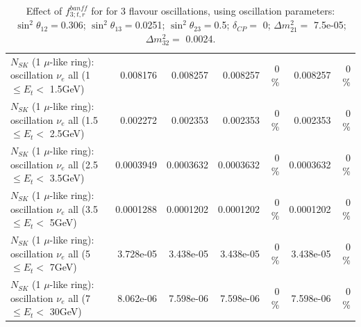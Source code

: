 \begin{table}
\begin{tabular}{| l | r | r | r  r | r  r |}
$N_{SK}$ (1 $\mu$-like ring): oscillation $\nu_{e}$ all (1 $\leq E_{t} <$ 1.5GeV) &        0.008176 &        0.008257 &        0.008257 &        0 \%  &        0.008257 &        0 \%  \\ 
$N_{SK}$ (1 $\mu$-like ring): oscillation $\nu_{e}$ all (1.5 $\leq E_{t} <$ 2.5GeV) &        0.002272 &        0.002353 &        0.002353 &        0 \%  &        0.002353 &        0 \%  \\ 
$N_{SK}$ (1 $\mu$-like ring): oscillation $\nu_{e}$ all (2.5 $\leq E_{t} <$ 3.5GeV) &       0.0003949 &       0.0003632 &       0.0003632 &        0 \%  &       0.0003632 &        0 \%  \\ 
$N_{SK}$ (1 $\mu$-like ring): oscillation $\nu_{e}$ all (3.5 $\leq E_{t} <$ 5GeV) &       0.0001288 &       0.0001202 &       0.0001202 &        0 \%  &       0.0001202 &        0 \%  \\ 
 $N_{SK}$ (1 $\mu$-like ring): oscillation $\nu_{e}$ all (5 $\leq E_{t} <$ 7GeV) &       3.728e-05 &       3.438e-05 &       3.438e-05 &        0 \%  &       3.438e-05 &        0 \%  \\ 
$N_{SK}$ (1 $\mu$-like ring): oscillation $\nu_{e}$ all (7 $\leq E_{t} <$ 30GeV) &       8.062e-06 &       7.598e-06 &       7.598e-06 &        0 \%  &       7.598e-06 &        0 \%  \\ 
\hline
\hline
\end{tabular}
\caption{ Effect of $f_{3; t, r}^{banff}$ for for 3 flavour oscillations, using oscillation parameters:  $\sin^2\theta_{12} = $0.306; $\sin^2\theta_{13} = $0.0251; $\sin^2\theta_{23} = $0.5; $\delta_{CP} = $        0; $\Delta m^2_{21} = $    7.5e-05; $\Delta m^2_{32} = $    0.0024. }
\label{tab:num_banff_03_1RmuT_3f_osc_t13:0.0251}
\end{table}
\clearpage
